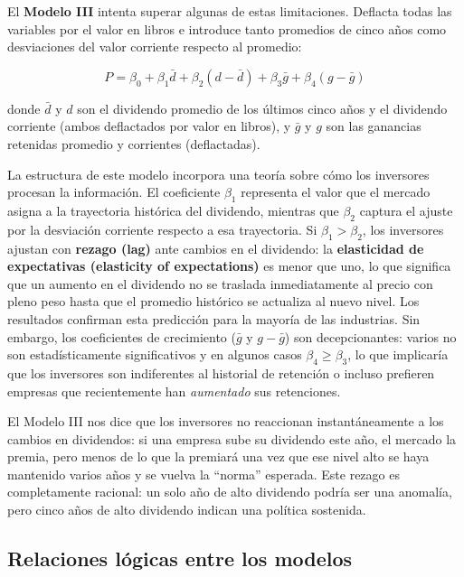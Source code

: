 \documentclass[12pt]{article}
\begin{document}
El \textbf{Modelo III} intenta superar algunas de estas limitaciones. Deflacta todas las variables por el valor en libros e introduce tanto promedios de cinco a\~nos como desviaciones del valor corriente respecto al promedio:

\[
P = \beta_0 + \beta_1 \bar{d} + \beta_2 (d - \bar{d}) + \beta_3 \bar{g} + \beta_4 (g - \bar{g})
\]

donde $\bar{d}$ y $d$ son el dividendo promedio de los \'ultimos cinco a\~nos y el dividendo corriente (ambos deflactados por valor en libros), y $\bar{g}$ y $g$ son las ganancias retenidas promedio y corrientes (deflactadas).

\begin{explicacion}
La estructura de este modelo incorpora una teor\'ia sobre c\'omo los inversores procesan la informaci\'on. El coeficiente $\beta_1$ representa el valor que el mercado asigna a la trayectoria hist\'orica del dividendo, mientras que $\beta_2$ captura el ajuste por la desviaci\'on corriente respecto a esa trayectoria. Si $\beta_1 > \beta_2$, los inversores ajustan con \textbf{rezago (lag)} ante cambios en el dividendo: la \textbf{elasticidad de expectativas (elasticity of expectations)} es menor que uno, lo que significa que un aumento en el dividendo no se traslada inmediatamente al precio con pleno peso hasta que el promedio hist\'orico se actualiza al nuevo nivel. Los resultados confirman esta predicci\'on para la mayor\'ia de las industrias. Sin embargo, los coeficientes de crecimiento ($\bar{g}$ y $g-\bar{g}$) son decepcionantes: varios no son estad\'isticamente significativos y en algunos casos $\beta_4 \geq \beta_3$, lo que implicar\'ia que los inversores son indiferentes al historial de retenci\'on o incluso prefieren empresas que recientemente han \textit{aumentado} sus retenciones.
\end{explicacion}

\begin{intuicion}
El Modelo III nos dice que los inversores no reaccionan instant\'aneamente a los cambios en dividendos: si una empresa sube su dividendo este a\~no, el mercado la premia, pero menos de lo que la premiar\'a una vez que ese nivel alto se haya mantenido varios a\~nos y se vuelva la ``norma'' esperada. Este rezago es completamente racional: un solo a\~no de alto dividendo podr\'ia ser una anomal\'ia, pero cinco a\~nos de alto dividendo indican una pol\'itica sostenida.
\end{intuicion}

\subsection{Relaciones l\'ogicas entre los modelos}
\end{document}
